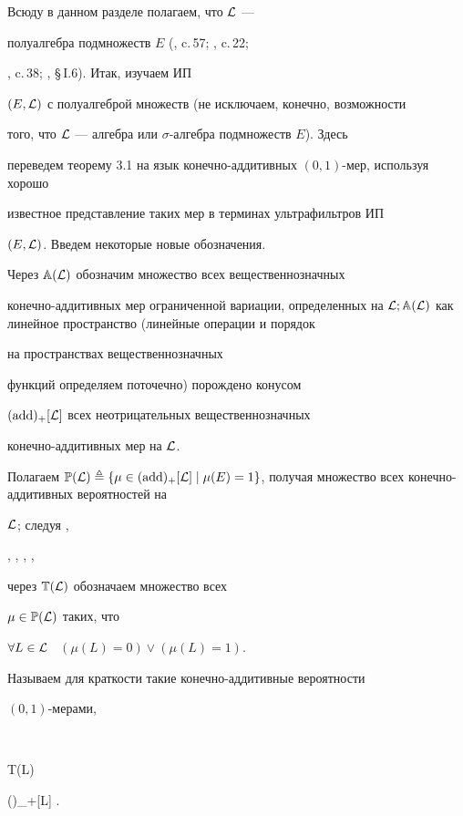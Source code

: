 {Всюду в данном разделе полагаем, что ${\cal L}$ ---


полуалгебра подмножеств $E$ (\cite{2}, c.\,57; \cite{5}, c.\,22;


\cite{6}, c.\,38; \cite{11}, \S\,I.6). Итак, изучаем ИП


$(E,{\cal L})$ с полуалгеброй множеств (не исключаем, конечно, возможности


того, что ${\cal L}$ --- алгебра или $\sigma$-алгебра подмножеств $E$). Здесь


переведем теорему 3.1 на язык конечно-аддитивных $(0,1)$-мер, используя хорошо


известное представление таких мер в терминах ультрафильтров ИП


$(E,{\cal L})$. Введем некоторые новые обозначения.


Через ${\Bbb A}({\cal L})$ обозначим множество всех вещественнозначных 


конечно-аддитивных мер ограниченной вариации, определенных на ${\cal L};


{\Bbb A}({\cal L})$ как линейное пространство (линейные операции и порядок


на пространствах вещественнозначных


функций определяем поточечно) порождено конусом


$(\operatorname{add})_+[{\cal L}]$ всех неотрицательных вещественнозначных


конечно-аддитивных мер на ${\cal L}$.


Полагаем ${{\Bbb P}({\cal L})} \triangleq \{\mu \in (\add)_+[{\cal L}] \mid


{{\mu}(E)} = 1\}$, получая множество всех конечно-аддитивных вероятностей на


${\cal L}$; следуя \cite{5},


\cite{6}, \cite{9}, \cite{10}, \cite{12},


через ${\Bbb T}({\cal L})$ обозначаем множество  всех


$\mu \in {\Bbb P}({\cal L})$ таких, что


$\forall{L} \in {\cal L}$ \ $({{\mu}(L)} = 0) \vee ({{\mu}(L)} = 1)$.


Называем для краткости такие конечно-аддитивные вероятности


$(0,1)$-мерами,


$$


{{\Bbb T}({\cal L})}  \subset


(\add)_+[{\cal L}] .


}
